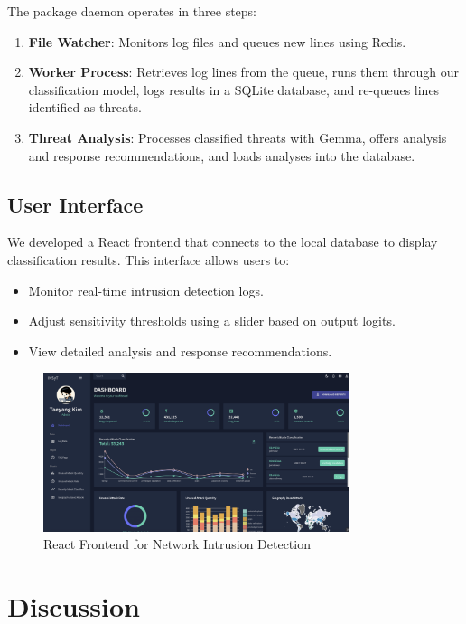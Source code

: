 \documentclass[12pt]{article}
\begin{document}
The package daemon operates in three steps:

\begin{enumerate}
    \item \textbf{File Watcher}: Monitors log files and queues new lines using Redis.
    \item \textbf{Worker Process}: Retrieves log lines from the queue, runs them through our classification model, logs results in a SQLite database, and re-queues lines identified as threats.
    \item \textbf{Threat Analysis}: Processes classified threats with Gemma, offers analysis and response recommendations, and loads analyses into the database.
\end{enumerate}

\subsection{User Interface}

We developed a React frontend that connects to the local database to display classification results. This interface allows users to:

\begin{itemize}
    \item Monitor real-time intrusion detection logs.
    \item Adjust sensitivity thresholds using a slider based on output logits.
    \item View detailed analysis and response recommendations.
\end{itemize}

\begin{figure}[htbp]
    \centering
    \includegraphics[width=0.8\textwidth]{react.png}
    \caption{React Frontend for Network Intrusion Detection}
    \label{fig:react}
\end{figure}

\section{Discussion}
\end{document}
